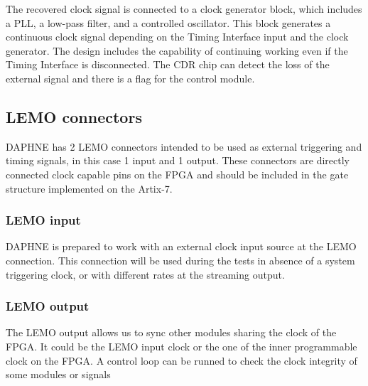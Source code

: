 The recovered clock signal is connected to a clock generator block, which includes a PLL, a low-pass filter, and a controlled oscillator. This block generates a continuous  clock signal depending on the Timing Interface input and the clock generator. The design includes the capability of continuing working even if the Timing Interface is disconnected. The CDR chip can detect the loss of the external signal and there is a flag for the control module. 

\subsection{LEMO connectors}

DAPHNE has 2 LEMO connectors intended to be used as external triggering and timing signals, in this case 1 input and 1 output. These connectors are directly connected clock capable pins on the FPGA and should be included in the gate structure implemented on the Artix-7.


\subsubsection{LEMO input} DAPHNE is prepared to work with an external clock input source at the LEMO connection. This connection will be used during the tests in absence of a system triggering clock, or with different rates at the streaming output.

\subsubsection{LEMO output}
The LEMO output allows us to sync other modules sharing the clock of the FPGA. It could be the LEMO input clock or the one of the inner programmable clock on the FPGA. A control loop can be runned to check the clock integrity of some modules or signals